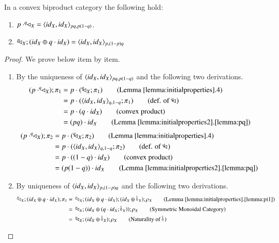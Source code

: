 \begin{lemma}\label{lemma:pdiag} \label{lemma:diagp}
In a convex biproduct category the following hold:
\begin{enumerate}
\item $p \cdot ^q\!\! \lhd_{X} = \langle {id}_{X},{id}_{X}\rangle_{pq, p(1-q)} $.%
\item $^p\!\! \lhd_{X}; ({id}_{X} \oplus q\cdot {id}_{X})=\langle {id}_{X},{id}_{X}\rangle_{p,(1-p)q}$ %
\end{enumerate}
\end{lemma}
\begin{proof}
We prove below item by item.
\begin{enumerate}
\item By the uniqueness of $\langle {id}_{X},{id}_{X}\rangle_{pq, p(1-q)}$ and the following two derivations.
\begin{align*}
(p \cdot \diagq{X})  ; \pi_1 &= p \cdot (\diagq{X};\pi_1) \tag{Lemma \ref{lemma:initialproperties}.4}\\
&=p\cdot (\langle \id{X},\id{X}\rangle_{q,1-q} ; \pi_1) \tag{def. of $\diagq{}$}\\
&= p\cdot (q \cdot \id{X}) \tag{convex product}\\
&= (p q) \cdot \id{X} \tag{Lemma~\ref{lemma:initialproperties2}.\ref{lemma:pq}}
\end{align*}
\begin{align*}
(p \cdot \diagq{X})  ; \pi_2 &= p \cdot (\diagq{X};\pi_2) \tag{Lemma \ref{lemma:initialproperties}.4}\\
&=p\cdot (\langle \id{X},\id{X}\rangle_{q,1-q} ; \pi_2) \tag{def. of $\diagq{}$}\\
&= p\cdot ((1-q) \cdot \id{X}) \tag{convex product}\\
&= (p (1-q)) \cdot \id{X} \tag{Lemma~\ref{lemma:initialproperties2}.\ref{lemma:pq}}
\end{align*}
\item By uniqueness of $\langle {id}_{X},{id}_{X}\rangle_{p,(1-p)q}$ and the following two derivations. 
\begin{align*}
\diagp{X}; (\id{X} \oplus q\cdot \id{X}) ; \pi_1 &=\, \diagp{X}; (\id{X} \oplus q\cdot \id{X}) ; (\id{X}\oplus \bang{X});\runit{X} \tag{Lemma \ref{lemma:initialproperties}.\ref{lemma:pi1}}\\
&=\, \diagp{X}; (\id{X} \oplus (q\cdot \id{X} ; \bang{X})); \runit{X} \tag{Symmetric Monoidal Category}\\
&=\, \diagp{X}; (\id{X} \oplus  \bang{X}); \runit{X} \tag{Naturality of $\bang{}$} \\

\end{align*}
\end{enumerate}
\end{proof}
